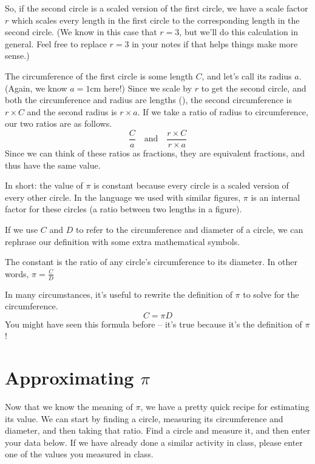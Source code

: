 \documentclass{ximera}
\begin{document}
\begin{example}
So, if the second circle is a scaled version of the first circle, we have a scale factor $r$ which scales every length in the first circle to the corresponding length in the second circle. (We know in this case that $r=3$, but we'll do this calculation in general. Feel free to replace $r=3$ in your notes if that helps things make more sense.)

The circumference of the first circle is some length $C$, and let's call its radius $a$. (Again, we know $a=1$cm here!) Since we scale by $r$ to get the second circle, and both the circumference and radius are lengths (), the second circumference is $r \times C$ and the second radius is $r \times a$. If we take a ratio of radius to circumference, our two ratios are as follows.
\[
\frac{C}{a} \quad \textrm{and} \quad \frac{r\times C}{r\times a}
\]
Since we can think of these ratios as fractions, they are equivalent fractions, and thus have the same value.

\end{example}

In short: the value of $\pi$ is constant because every circle is a scaled version of every other circle. In the language we used with similar figures, $\pi$ is an internal factor for these circles (a ratio between two lengths in a figure).

If we use $C$ and $D$ to refer to the circumference and diameter of a circle, we can rephrase our definition with some extra mathematical symbols.
\begin{definition}
The constant \dfn{$\pi$} is the ratio of any circle's circumference to its diameter. In other words, $\pi = \frac{C}{D}$
\end{definition}
In many circumstances, it's useful to rewrite the definition of $\pi$ to solve for the circumference.
\[
C = \pi D
\]
You might have seen this formula before -- it's true because it's the definition of $\pi$!


\section{Approximating $\pi$}

Now that we know the meaning of $\pi$, we have a pretty quick recipe for estimating its value. We can start by finding a circle, measuring its circumference and diameter, and then taking that ratio. Find a circle and measure it, and then enter your data below. If we have already done a similar activity in class, please enter one of the values you measured in class.
\end{document}
